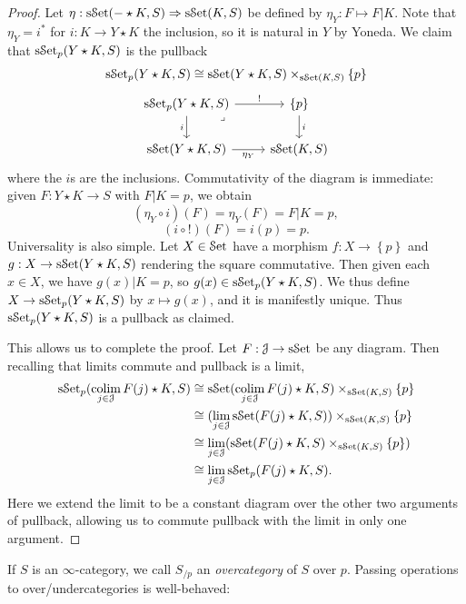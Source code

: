 \begin{proof}
	Let $\eta : \mathrm{s}\mathcal{S}\mathrm{et}(-\star K,S) \Rightarrow \mathrm{s}\mathcal{S}\mathrm{et} (K,S)$ be defined by $\eta _Y : F\mapsto F|K$. Note that $\eta_Y =i^*$ for $i : K \to Y\star K$ the inclusion, so it is natural in $Y$ by Yoneda. We claim that $\mathrm{s}\mathcal{S}\mathrm{et} _p(Y \star K,S)$ is the pullback
	\[
		\mathrm{s}\mathcal{S}\mathrm{et} _p(Y\star K,S)\cong \mathrm{s}\mathcal{S}\mathrm{et} (Y\star K,S)\times_{\mathrm{s}\mathcal{S}\mathrm{et} (K,S)} \left\{ p \right\} 
	\]
\[\begin{tikzcd}
	{\sSet_p(Y\star K,S)} & {\{p\}} \\
	{\sSet(Y\star K,S)} & {\sSet(K,S)}
	\arrow["{!}", from=1-1, to=1-2]
	\arrow["i"', from=1-1, to=2-1]
	\arrow["\lrcorner"{anchor=center, pos=0.125}, draw=none, from=1-1, to=2-2]
	\arrow["i", from=1-2, to=2-2]
	\arrow["{\eta_Y}"', from=2-1, to=2-2]
\end{tikzcd}\]
	where the $i$s are the inclusions. Commutativity of the diagram is immediate: given $F : Y\star K \to S$ with $F|K=p$, we obtain
	\[
		(\eta _Y \circ i)(F)=\eta _Y(F)=F|K=p,
	\]
	\[
		(i\circ !)(F)=i(p)=p
	.\]
	Universality is also simple. Let $X\in \mathcal{S}\mathrm{et} $ have a morphism $f : X\to \left\{ p \right\} $ and $g : X \to \mathrm{s}\mathcal{S}\mathrm{et} (Y\star K,S)$ rendering the square commutative. Then given each $x\in X$, we have $g(x)|K=p$, so $g(x)\in \mathrm{s}\mathcal{S}\mathrm{et} _p(Y\star K,S)$. We thus define $X\to \mathrm{s}\mathcal{S}\mathrm{et} _p(Y\star K,S)$ by $x\mapsto g(x)$, and it is manifestly unique. Thus $\mathrm{s}\mathcal{S}\mathrm{et} _p(Y\star K,S)$ is a pullback as claimed.

	This allows us to complete the proof. Let $F : \mathcal{J}  \to \mathrm{s}\mathcal{S}\mathrm{et} $ be any diagram. Then recalling that limits commute and pullback is a limit,
	\begin{align*}
		\mathrm{s}\mathcal{S}\mathrm{et} _p(\operatorname*{colim}_{j\in \mathcal{J} }F(j)\star K,S)&\cong \mathrm{s}\mathcal{S}\mathrm{et} (\operatorname*{colim}_{j\in \mathcal{J} } F(j)\star K,S)\times_{\mathrm{s}\mathcal{S}\mathrm{et} (K,S)} \left\{ p \right\} \\
					   &\cong (\lim_{j\in \mathcal{J} } \mathrm{s}\mathcal{S}\mathrm{et} (F(j)\star K,S))\times _{\mathrm{s}\mathcal{S}\mathrm{et} (K,S)} \left\{ p \right\} \\
					   &\cong \lim_{j\in \mathcal{J} } (\mathrm{s}\mathcal{S}\mathrm{et} (F(j)\star K,S)\times_{\mathrm{s}\mathcal{S}\mathrm{et} (K,S)} \left\{ p \right\} )\\
					   &\cong \lim_{j \in \mathcal{J}  } \mathrm{s}\mathcal{S}\mathrm{et} _p(F(j)\star K,S)
	.\end{align*}
	Here we extend the limit to be a constant diagram over the other two arguments of pullback, allowing us to commute pullback with the limit in only one argument.
\end{proof}

If $S$ is an $\infty $-category, we call $S_{/p} $ an \emph{overcategory} of $S$ over $p$. Passing operations to over/undercategories is well-behaved:

